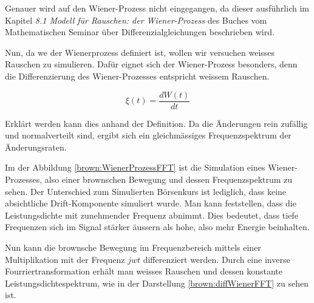 Genauer wird auf den Wiener-Prozess nicht eingegangen, da dieser ausführlich im Kapitel \textit{8.1 Modell für Rauschen: der Wiener-Prozess} des Buches \cite{buch:mathsem-dgl} vom Mathematischen Seminar über Differenzialgleichungen beschrieben wird.


Nun, da we der Wienerprozess definiert ist, wollen wir versuchen weisses Rauschen zu simulieren. Dafür eignet sich der Wiener-Prozess besonders, denn die Differenzierung des Wiener-Prozesses entspricht weissem Rauschen.

\begin{equation}
	\xi(t) = \frac{dW(t)}{dt}
\end{equation}

Erklärt werden kann dies anhand der Definition. Da die Änderungen rein zufällig und normalverteilt sind, ergibt sich ein gleichmässiges Frequenzspektrum der Änderungsraten.


Im der Abbildung \ref{brown:WienerProzessFFT} ist die Simulation eines Wiener-Prozesses, also einer brownschen Bewegung und dessen Frequenzspektrum zu sehen. Der Unterschied zum Simulierten Börsenkurs ist lediglich, dass keine absichtliche Drift-Komponente simuliert wurde. Man kann feststellen, dass die Leistungsdichte mit zunehmender Frequenz abnimmt. Dies bedeutet, dass tiefe Frequenzen sich im Signal stärker äussern als hohe, also mehr Energie beinhalten.

Nun kann die brownsche Bewegung im Frequenzbereich mittels einer Multiplikation mit der Frequenz $ jwt $ differenziert werden. Durch eine inverse Fourriertransformation erhält man weisses Rauschen und dessen konstante Leistungsdichtespektrum, wie in der Darstellung \ref{brown:diffWienerFFT} zu sehen ist.



